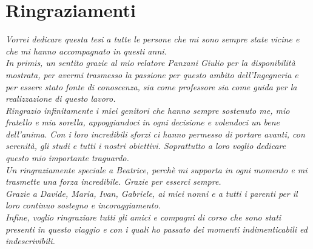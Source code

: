 \chapter*{Ringraziamenti}
\label{cha:ring}
\textit{Vorrei dedicare questa tesi a tutte le persone che mi sono sempre state vicine e che mi hanno accompagnato in questi anni.}\\

\textit{In primis, un sentito grazie al mio relatore Panzani Giulio per la disponibilità mostrata, per avermi trasmesso la passione per questo ambito dell'Ingegneria e per essere stato fonte di conoscenza, sia come professore sia come guida per la realizzazione di questo lavoro.}\\

\textit{Ringrazio infinitamente i miei genitori che hanno sempre sostenuto me, mio fratello e mia sorella, appoggiandoci in ogni decisione e volendoci un bene dell'anima. Con i loro incredibili sforzi ci hanno permesso di portare avanti, con serenità, gli studi e tutti i nostri obiettivi. Soprattutto a loro voglio dedicare questo mio importante traguardo.}\\

\textit{Un ringraziamente speciale a Beatrice, perchè mi supporta in ogni momento e mi trasmette una forza incredibile. Grazie per esserci sempre.}\\

\textit{Grazie a Davide, Maria, Ivan, Gabriele, ai miei nonni e a tutti i parenti per il loro continuo sostegno e incoraggiamento.}\\

\textit{Infine, voglio ringraziare tutti gli amici e compagni di corso che sono stati presenti in questo viaggio e con i quali ho passato dei momenti indimenticabili ed indescrivibili.}\\
